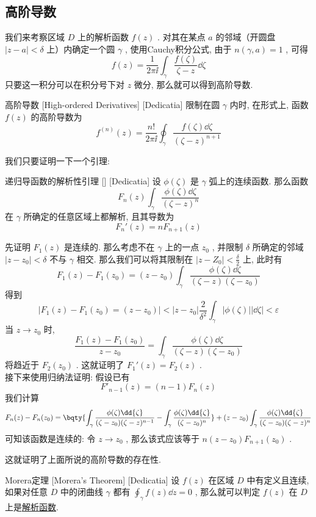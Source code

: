 \documentclass[UTF8]{ctexart}
\newcommand{\AnalyticalFunction}{\hyperref[dfn:AnalyticalFunction]{解析函数}}
\begin{document}
\subsection{高阶导数}
我们来考察区域 \( D \) 上的解析函数 \( f(z) \) . 对其在某点 \( a \) 的邻域（开圆盘 \( |z-a|<\delta \) 上）内确定一个圆 \( \gamma \) , 使用Cauchy积分公式, 由于 \( n(\gamma,a)=1 \) , 可得
\[f(z)=\frac{1}{2\pi\ii}\int_\gamma\frac{f(\zeta)}{\zeta-z}\dd{\zeta}\]
只要这一积分可以在积分号下对 \( z \) 微分, 那么就可以得到高阶导数. 
\begin{dfn}
    [HighOrderedDerivative]
    {高阶导数}
    [High-ordered Derivatives]
    [Dedicatia]
    限制在圆 \( \gamma \) 内时, 在形式上, 函数 \( f(z) \) 的高阶导数为
    \[f^{(n)}(z)=\frac{n!}{2\pi\ii}\oint_\gamma\frac{f(\zeta)\dd{\zeta}}{(\zeta-z)^{n+1}}\]
\end{dfn}
我们只要证明一下一个引理: 
\begin{lma}
    [UUID]
    {递归导函数的解析性引理}
    []
    [Dedicatia]
    设 \( \phi(\zeta) \) 是 \( \gamma \) 弧上的连续函数. 那么函数
    \[F_n(z)\int_\gamma \frac{\phi(\zeta)\dd{\zeta}}{(\zeta-z)^n}\]
    在 \( \gamma \) 所确定的任意区域上都解析, 且其导数为
    \[F_n'(z)=nF_{n+1}(z)\]
\end{lma}
\begin{prf}
    先证明 \( F_1(z) \) 是连续的. 那么考虑不在 \( \gamma \) 上的一点 \( z_0 \) , 并限制 \( \delta \) 所确定的邻域 \( |z-z_0|<\delta \) 不与 \( \gamma \) 相交. 那么我们可以将其限制在 \( |z-Z_0|<\frac{\delta}{2} \) 上, 此时有
    \[F_1(z)-F_1(z_0)=(z-z_0)\int_\gamma\frac{\phi(\zeta)\dd{\zeta}}{(\zeta-z)(\zeta-z_0)}\]
    得到
    \[|F_1(z)-F_1(z_0)=(z-z_0)|<|z-z_0|\frac{2}{\delta^2}\int_\gamma|\phi(\zeta)||\dd{\zeta}|<\varepsilon\]
    当 \( z\to z_0 \) 时, 
    \[\frac{F_1(z)-F_1(z_0)}{z-z_0}=\int_\gamma\frac{\phi(\zeta)\dd{\zeta}}{(\zeta-z)(\zeta-z_0)}\]
    将趋近于 \( F_2(z_0) \) . 这就证明了 \( F_1'(z)=F_2(z)  \) .\\
    接下来使用归纳法证明: 假设已有
    \[F'_{n-1}(z)=(n-1)F_n(z)\]
    我们计算
    \[F_n(z)-F_n(z_0)=\bqty{\int_\gamma\frac{\phi(\zeta)\dd{\zeta}}{(\zeta-z_0)(\zeta-z)^{n-1}}-\int_\gamma\frac{\phi(\zeta)\dd{\zeta}}{(\zeta-z_0)^n}}+(z-z_0)\int_\gamma\frac{\phi(\zeta)\dd{\zeta}}{(\zeta-z_0)(\zeta-z)^{n}}\]
    可知该函数是连续的: 令 \( z\to z_0 \) , 那么该式应该等于 \( n(z-z_0)F_{n+1}(z_0) \) .
\end{prf}
这就证明了上面所说的高阶导数的存在性. 
\begin{thm}
    [UUID]
    {Morera定理}
    [Morera's Theorem]
    [Dedicatia]
    设 \( f(z) \) 在区域 \( D \) 中有定义且连续, 如果对任意 \( D \) 中的闭曲线 \( \gamma \) 都有 \( \oint_\gamma f(z)\dd{z}=0 \) , 那么就可以判定 \( f(z) \) 在 \( D \) 上是\AnalyticalFunction .
\end{thm}
\end{document}
